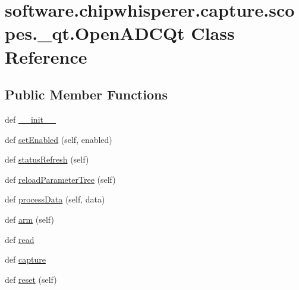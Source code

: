 \hypertarget{classsoftware_1_1chipwhisperer_1_1capture_1_1scopes_1_1__qt_1_1OpenADCQt}{}\section{software.\+chipwhisperer.\+capture.\+scopes.\+\_\+qt.\+Open\+A\+D\+C\+Qt Class Reference}
\label{classsoftware_1_1chipwhisperer_1_1capture_1_1scopes_1_1__qt_1_1OpenADCQt}
\subsection*{Public Member Functions}
\begin{DoxyCompactItemize}
\item 
def \hyperlink{classsoftware_1_1chipwhisperer_1_1capture_1_1scopes_1_1__qt_1_1OpenADCQt_ac3ff2bf28d2f89499fa7646ad22c1fcf}{\+\_\+\+\_\+init\+\_\+\+\_\+}
\item 
def \hyperlink{classsoftware_1_1chipwhisperer_1_1capture_1_1scopes_1_1__qt_1_1OpenADCQt_ac36a189fe6c7b502057549242b71d522}{set\+Enabled} (self, enabled)
\item 
def \hyperlink{classsoftware_1_1chipwhisperer_1_1capture_1_1scopes_1_1__qt_1_1OpenADCQt_a3030b0d3f2acaa8a6fe970ecc0736c38}{status\+Refresh} (self)
\item 
def \hyperlink{classsoftware_1_1chipwhisperer_1_1capture_1_1scopes_1_1__qt_1_1OpenADCQt_a56039eeb18206922557d4ea6270ddf31}{reload\+Parameter\+Tree} (self)
\item 
def \hyperlink{classsoftware_1_1chipwhisperer_1_1capture_1_1scopes_1_1__qt_1_1OpenADCQt_ad3b94ef64b2588e32bd61ca26133e78b}{process\+Data} (self, data)
\item 
def \hyperlink{classsoftware_1_1chipwhisperer_1_1capture_1_1scopes_1_1__qt_1_1OpenADCQt_a56bf3ac5ba158063ed2b2d18c1d849e9}{arm} (self)
\item 
def \hyperlink{classsoftware_1_1chipwhisperer_1_1capture_1_1scopes_1_1__qt_1_1OpenADCQt_a79f9b2e0591549baefe8f80000b633b4}{read}
\item 
def \hyperlink{classsoftware_1_1chipwhisperer_1_1capture_1_1scopes_1_1__qt_1_1OpenADCQt_a1245decae64f2006c032def983321fa3}{capture}
\item 
def \hyperlink{classsoftware_1_1chipwhisperer_1_1capture_1_1scopes_1_1__qt_1_1OpenADCQt_a1a75d504533922b1e6aad39ac7ccff45}{reset} (self)
\item 

\end{DoxyCompactItemize}
